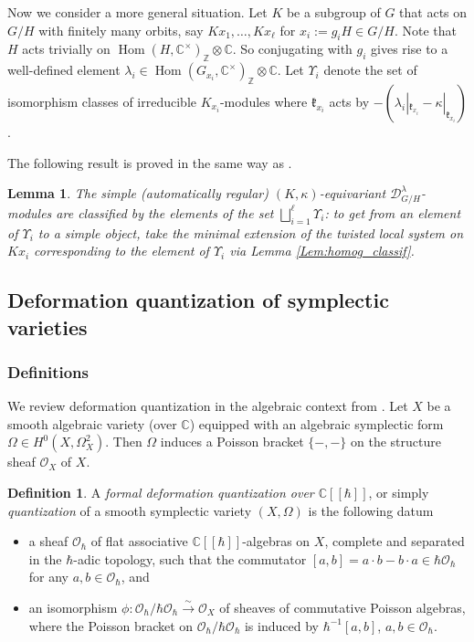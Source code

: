 \documentclass[12pt]{amsart}
\newcommand{\C}{\mathbb{C}}
\newcommand{\Z}{\mathbb{Z}}
\newcommand{\kf}{\mathfrak{k}}
\newcommand{\OO}{\mathcal{O}}
\newtheorem{Lem}[Thm]{Lemma}
\theoremstyle{definition}
\newtheorem{defi}[Thm]{Definition}
\numberwithin{equation}{section}
\begin{document}
Now we consider a more general situation. Let $K$ be a subgroup of $G$ that acts
on $G/H$ with finitely many orbits, say $Kx_1,\ldots, Kx_\ell$ for $x_i:=g_i H\in G/H$.
Note that $H$ acts trivially on $\operatorname{Hom}(H,\C^\times)_{\Z} \otimes \C$. So conjugating with
$g_i$ gives rise to a well-defined element $\lambda_i\in \operatorname{Hom}(G_{x_i},\C^\times)_{\Z} \otimes \C$.
Let $\Upsilon_i$ denote the set of isomorphism classes of irreducible $K_{x_i}$-modules
where $\kf_{x_i}$ acts by $-(\lambda_i|_{\kf_{x_i}}-\kappa|_{\kf_{x_i}})$.

The following result is proved in the same way as \cite[Theorem 11.6.1,(ii)]{Hotta}.

\begin{Lem}\label{Lem:fin_many_orbit_classif}
The simple (automatically regular) $(K,\kappa)$-equivariant $\mathscr{D}^{\lambda}_{G/H}$-modules
are classified by the elements of the set $\bigsqcup_{i=1}^\ell \Upsilon_i$:
to get from an element of $\Upsilon_i$ to a simple object, take the minimal extension of the twisted local
system on $Kx_i$ corresponding to the element of $\Upsilon_i$ via Lemma \ref{Lem:homog_classif}.
\end{Lem}



\subsection{Deformation quantization of symplectic varieties}\label{subsec:quan}
\subsubsection{Definitions}
We review deformation quantization in the algebraic context from \cite{BK}. Let $X$ be a smooth algebraic variety (over $\C$) equipped with an algebraic symplectic form $\Omega \in H^0(X, \Omega_X^2)$. Then $\Omega$ induces a  Poisson bracket $\{ - , -\}$ on the structure sheaf $\OO_X$ of $X$.

\begin{defi}\label{defi:formal_quan_t}
	A \emph{formal deformation quantization over $\C[[\hbar]]$}, or simply {\it quantization} of a smooth symplectic variety $(X,\Omega)$ is the following datum
	\begin{itemize}
		\item
		a sheaf $\OO_\hbar$ of flat associative $\C[[\hbar]]$-algebras on $X$, complete and separated in the $\hbar$-adic topology, such that the commutator $[a, b] = a \cdot b - b \cdot a \in \hbar \OO_\hbar$ for any $a, b \in \OO_\hbar$, and
		\item
		an isomorphism $\phi: \OO_\hbar / \hbar \OO_\hbar \xrightarrow{\sim} \OO_X$ of sheaves of commutative Poisson algebras, where the Poisson bracket on $ \OO_\hbar / \hbar \OO_\hbar$ is induced by $\hbar^{-1}[a,b]$, $a, b \in \OO_\hbar$.
	\end{itemize}
\end{defi}
\end{document}
